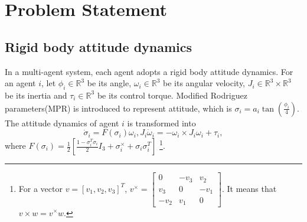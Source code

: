 \section{Problem Statement}
\label{sec:prob_stat}

\subsection{Rigid body attitude dynamics}
\label{sec:att_dyn}

In a multi-agent system, each agent adopts a rigid body attitude dynamics.
For an agent $ i $, let $ \phi_{i}  \in \mathbb{R}^{3} $ be its angle, $ \omega_{i} \in \mathbb{R}^{3} $ be its angular velocity, 
$ J_{i} \in \mathbb{R}^{3} \times \mathbb{R}^{3} $ be its inertia and $ \tau_{i} \in \mathbb{R}^{3} $ be its control torque.
Modified Rodriguez parameters(MPR) is introduced to represent attitude, which is $ \sigma_{i} = a_{i} \tan( \frac{ \phi_{i} }{4} ) $.
The attitude dynamics of agent $ i $ is transformed into 
\begin{subequations}
\begin{equation}
 \dot{\sigma}_{i} = F( \sigma_{i} ) \omega_{i},
\end{equation}
\begin{equation} 
  J_{i} \dot{\omega}_{i} = - \omega_{i} \times J_{i} \omega_{i} + \tau_{i},
\end{equation}  
\end{subequations}  
where $ F( \sigma_{i} ) = \frac{1}{2} \left[  \frac{ 1 - \sigma^{T}_{i} \sigma_{i} }{2} I_{3} + \sigma_{i}^{ \times } + \sigma_{i} \sigma^{T}_{i} \right] $
\footnote{ For a vector $ v = [ v_{1}, v_{2}, v_{3} ]^{T} $, $ v^{\times} = \begin{bmatrix} 0 & - v_{3} & v_{2} \\ v_{3} & 0 & - v_{1} \\ - v_{2} & v_{1} & 0 \end{bmatrix} $. It means that $ v \times w = v^{\times} w $. }.

